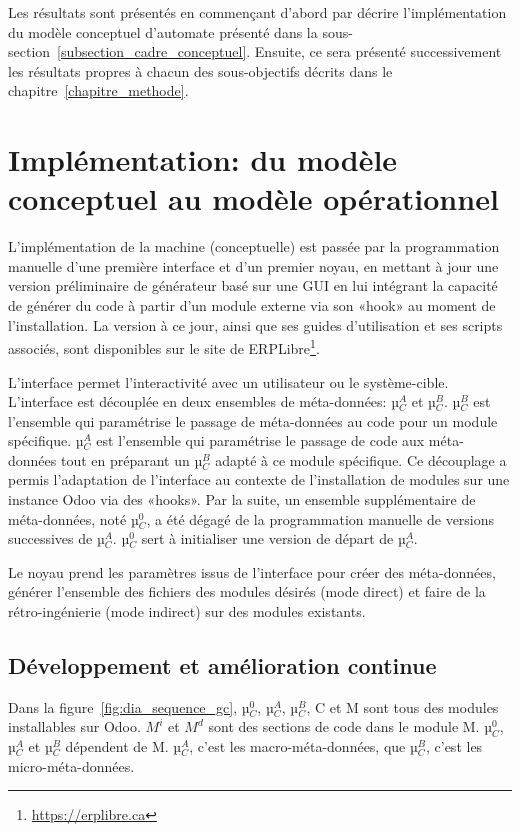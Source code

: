 \label{sec:Theme2}

Les résultats sont présentés en commençant d’abord par décrire l’implémentation du modèle conceptuel d’automate présenté dans la sous-section~\ref{subsection_cadre_conceptuel}. Ensuite, ce sera présenté successivement les résultats propres à chacun des sous-objectifs décrits dans le chapitre~\ref{chapitre_methode}.

\section{Implémentation: du modèle conceptuel au modèle opérationnel}

L’implémentation de la machine (conceptuelle) est passée par la programmation manuelle d’une première interface et d’un premier noyau, en mettant à jour une version préliminaire de générateur basé sur une GUI\cite{bluiksnot_repo} en lui intégrant la capacité de générer du code à partir d’un module externe via son «hook» au moment de l’installation. La version à ce jour, ainsi que ses guides d’utilisation et ses scripts associés, sont disponibles sur le site de ERPLibre\footnote{\url{https://erplibre.ca}}.

L’interface permet l’interactivité avec un utilisateur ou le système-cible. L’interface est découplée en deux ensembles de méta-données: µ$_C^A$ et µ$_C^B$. µ$_C^B$ est l’ensemble qui paramétrise le passage de méta-données au code pour un module spécifique. µ$_C^A$ est l’ensemble qui paramétrise le passage de code aux méta-données tout en préparant un µ$_C^B$ adapté à ce module spécifique. Ce découplage a permis l’adaptation de l’interface au contexte de l’installation de modules sur une instance Odoo via des «hooks». Par la suite, un ensemble supplémentaire de méta-données, noté µ$_C^0$, a été dégagé de la programmation manuelle de versions successives de µ$_C^A$. µ$_C^0$ sert à initialiser une version de départ de µ$_C^A$.

Le noyau prend les paramètres issus de l’interface pour créer des méta-données, générer l’ensemble des fichiers des modules désirés (mode direct) et faire de la rétro-ingénierie (mode indirect) sur des modules existants.

\subsection{Développement et amélioration continue}

Dans la figure~\ref{fig:dia_sequence_gc}, µ$_C^0$, µ$_C^A$, µ$_C^B$, C et M sont tous des modules installables sur Odoo. $M^i$ et $M^d$ sont des sections de code dans le module M. µ$_C^0$, µ$_C^A$ et µ$_C^B$ dépendent de M. µ$_C^A$, c’est les macro-méta-données, que µ$_C^B$, c’est les micro-méta-données.

